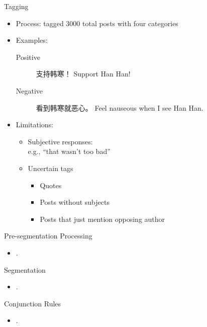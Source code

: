 \documentclass[12pt, trans]{beamer}
\newcommand{\1}[1]{{\mathbf 1}\left\{#1\right\}}        %
\begin{document}
\begin{frame}{Tagging}

\begin{itemize}[<+->]
\item  Process: tagged 3000 total posts with four categories
\item Examples:
	\begin{description}
	\item[Positive] 支持韩寒！ Support Han Han!
	\item[Negative] 看到韩寒就恶心。 Feel nauseous when I see Han Han.
	\end{description}


\item Limitations:
	
	\begin{itemize}
	\item Subjective responses:\\
		\quad e.g., ``that wasn't too bad''
	\item 	Uncertain tags
		\begin{itemize}
		\item Quotes
		\item Posts without subjects
		\item Posts that just mention opposing author
		\end{itemize}
	\end{itemize}

\end{itemize}

\end{frame}

\begin{frame}{Pre-segmentation Processing}

\begin{itemize}[<+->]
\item .
\end{itemize}

\end{frame}


\begin{frame}{Segmentation}

\begin{itemize}[<+->]
\item  .
\end{itemize}

\end{frame}

\begin{frame}{Conjunction Rules}

\begin{itemize}[<+->]
\item  .
\end{itemize}

\end{frame}
\end{document}

